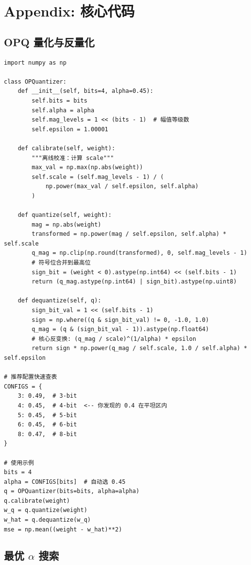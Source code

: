 \documentclass[11pt,a4paper]{article}
\begin{document}
\section{Appendix: 核心代码}

\subsection{OPQ 量化与反量化}

\begin{verbatim}
import numpy as np

class OPQuantizer:
    def __init__(self, bits=4, alpha=0.45):
        self.bits = bits
        self.alpha = alpha
        self.mag_levels = 1 << (bits - 1)  # 幅值等级数
        self.epsilon = 1.00001
        
    def calibrate(self, weight):
        """离线校准：计算 scale"""
        max_val = np.max(np.abs(weight))
        self.scale = (self.mag_levels - 1) / (
            np.power(max_val / self.epsilon, self.alpha)
        )
        
    def quantize(self, weight):
        mag = np.abs(weight)
        transformed = np.power(mag / self.epsilon, self.alpha) * self.scale
        q_mag = np.clip(np.round(transformed), 0, self.mag_levels - 1)
        # 符号位合并到最高位
        sign_bit = (weight < 0).astype(np.int64) << (self.bits - 1)
        return (q_mag.astype(np.int64) | sign_bit).astype(np.uint8)
    
    def dequantize(self, q):
        sign_bit_val = 1 << (self.bits - 1)
        sign = np.where((q & sign_bit_val) != 0, -1.0, 1.0)
        q_mag = (q & (sign_bit_val - 1)).astype(np.float64)
        # 核心反变换: (q_mag / scale)^(1/alpha) * epsilon
        return sign * np.power(q_mag / self.scale, 1.0 / self.alpha) * self.epsilon

# 推荐配置快速查表
CONFIGS = {
    3: 0.49,  # 3-bit
    4: 0.45,  # 4-bit  <-- 你发现的 0.4 在平坦区内
    5: 0.45,  # 5-bit
    6: 0.45,  # 6-bit
    8: 0.47,  # 8-bit
}

# 使用示例
bits = 4
alpha = CONFIGS[bits]  # 自动选 0.45
q = OPQuantizer(bits=bits, alpha=alpha)
q.calibrate(weight)
w_q = q.quantize(weight)
w_hat = q.dequantize(w_q)
mse = np.mean((weight - w_hat)**2)
\end{verbatim}

\subsection{最优 $\alpha$ 搜索}
\end{document}
